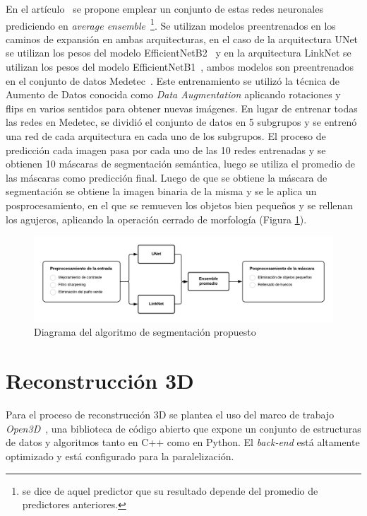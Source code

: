 {En el artículo~\cite{mahbod2021automatic} se propone emplear un conjunto de estas redes neuronales prediciendo en \textit{average ensemble}~\footnote{se dice de aquel predictor que su resultado depende del promedio de predictores anteriores.}. Se utilizan modelos preentrenados en los caminos de expansión en ambas arquitecturas, en el caso de la arquitectura UNet se utilizan los pesos del modelo EfficientNetB2~\cite{tan2019efficientnet} y en la arquitectura LinkNet se utilizan los pesos del modelo EfficientNetB1~\cite{tan2019efficientnet}, ambos modelos son preentrenados en el conjunto de datos Medetec~\cite{medetec}. Este entrenamiento se utilizó la técnica de Aumento de Datos conocida como \textit{Data Augmentation} aplicando rotaciones y flips en varios sentidos para obtener nuevas imágenes. En lugar de entrenar todas las redes en Medetec, se dividió el conjunto de datos en 5 subgrupos y se entrenó una red de cada arquitectura en cada uno de los subgrupos. El proceso de predicción cada imagen pasa por cada uno de las 10 redes entrenadas y se obtienen 10 máscaras de segmentación semántica, luego se utiliza el promedio de las máscaras como predicción final. Luego de que se obtiene la máscara de segmentación se obtiene la imagen binaria de la misma y se le aplica un posprocesamiento, en el que se remueven los objetos bien pequeños y se rellenan los agujeros, aplicando la operación cerrado de morfología (Figura \ref{fig:pipeSeg}).

\begin{figure}[ht]
	\centering
	\includegraphics[width=12cm]{./Graphics/segmentation.png}
	\caption{Diagrama del algoritmo de segmentación propuesto}
	\label{fig:pipeSeg}
\end{figure}

\section{Reconstrucción 3D}

Para el proceso de reconstrucción 3D se plantea el uso del marco de trabajo \textit{Open3D}~\cite{zhou2018open3d}, una biblioteca de código abierto que expone un conjunto de estructuras de datos y algoritmos  tanto en C++ como en Python. El \textit{back-end} está altamente optimizado y está configurado para la paralelización.

}
